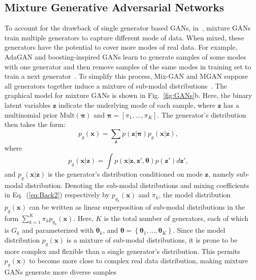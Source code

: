 \documentclass{article}
\begin{document}
\subsection{Mixture Generative Adversarial Networks}
\label{sec:MixGANs}


To account for the drawback of single generator based GANs, in~\cite{hoang2018mgan,tolstikhin2017adagan,arora2017generalization}, mixture GANs train multiple generators to capture different mode of data.
When mixed, these generators have the potential to cover more modes of real data.
For example, AdaGAN and boosting-inspired GANs learn to generate samples of some modes with one generator and then remove samples of the same modes in training set to train a next generator~\cite{tolstikhin2017adagan}.
To simplify this process, Mix-GAN and MGAN suppose all generators together induce a mixture of sub-modal distributions~\cite{hoang2018mgan,arora2017generalization}.
The graphical model for mixture GANs is shown in Fig.~\ref{fig:GANs}b.
Here, the binary latent variables $\mathbf{z}$ indicate the underlying mode of each sample, where $\mathbf{z}$ has a multinomial prior $\text{Mult}\left(\bm{\pi}\right)$ and $\bm{\pi}=\left[\pi_1,...,\pi_K\right]$.
The generator's distribution then takes the form:
\begin{equation}
p_g\left(\mathbf{x}\right)
=
\sum_{\mathbf{z}} p\left(\mathbf{z}|\bm{\pi}\right) p_g\left(\mathbf{x}|\mathbf{z}\right),
\label{eq:Back2}
\end{equation}
where
\begin{equation}
p_g\left(\mathbf{x}|\mathbf{z}\right) = \int
p\left(\mathbf{x}|\mathbf{z}, \mathbf{z}', \bm{\theta}\right) p\left(\mathbf{z}'\right)
d\mathbf{z}',
\label{eq:Back3}
\end{equation}
and $p_g\left(\mathbf{x}|\mathbf{z}\right)$ is the generator's distribution conditioned on mode $\mathbf{z}$, namely sub-modal distribution.
Denoting the sub-modal distributions and mixing coefficients in Eq.~(\ref{eq:Back2}) respectively by $p_{g_k}\left(\mathbf{x}\right)$ and $\pi_k$, the model distribution $p_g\left(\mathbf{x}\right)$ can be written as linear superposition of sub-modal distributions in the form $\sum_{k=1}^K\pi_k p_{g_k}\left(\mathbf{x}\right)$.
Here,  $K$ is the total number of generators, each of which is $G_k$ and parameterized with $\bm{\theta}_k$, and $\bm{\theta}=\left\{\bm{\theta}_1,...,\bm{\theta}_K\right\}$.
Since the model distribution $p_g\left(\mathbf{x}\right)$ is a mixture of sub-modal distributions, it is prone to be more complex and flexible than a single generator's distribution.
This permits $p_g\left(\mathbf{x}\right)$ to become more close to complex real data distribution, making mixture GANs generate more diverse samples
\end{document}
